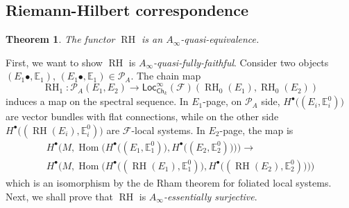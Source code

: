 \documentclass[12pt]{amsart}
\newtheorem{thm}{Theorem}[section]
\theoremstyle{definition}
\theoremstyle{remark}
\numberwithin{equation}{section}
\newcommand{\CF}{{\mathcal F}}
\newcommand{\A}{{A}}
\newcommand{\1}{{\mathbb{1}}}
\newcommand{\Ch}{\mathsf{Ch}}
\newcommand{\Loc}{\mathsf{Loc}}
\newcommand{\RH}{\operatorname{RH}}
\newcommand{\bt}{\bullet}
\newcommand{\Hom}{\operatorname{Hom}}
\begin{document}
\subsection{Riemann-Hilbert correspondence}
\begin{thm}
	The functor $\RH$ is an $A_{\infty}$-quasi-equivalence.
\end{thm}
First, we want to show $\RH$ is {\it $A_{\infty}$-quasi-fully-faithful}. Consider two objects $(E_1{\bt}, \mathbb{E}_1)$, $(E_1{\bt}, \mathbb{E}_1) \in  \mathcal{P}_{\A}$. The chain map
\begin{equation*}
    \RH_1:  \mathcal{P}_{\A}(E_1, E_2) \to \Loc^{\infty}_{\Ch_k}(\CF)(\RH_0(E_1), \RH_0(E_2))
\end{equation*}
induces a map on the spectral sequence.  In $E_1$-page, on $\mathcal{P}_{\A}$ side, $H^{\bt}\big((E_i, \mathbb{E}_i^0)\big)$ are vector bundles with flat connections, while on the other side $H^{\bt}\big((\RH(E_i), \mathbb{E}_i^0)\big)$ are $\CF$-local systems. In $E_2$-page, the map is 
\begin{align*}
    H^{\bt}\bigg(M, \Hom\Big( H^{\bt}\big((E_1, \mathbb{E}_1^0)\big), H^{\bt}\big((E_2, \mathbb{E}_2^0)\big)\Big)\bigg) \to\\
    H^{\bt}\bigg(M, \Hom\Big( H^{\bt}\big((\RH(E_1), \mathbb{E}_1^0)\big), H^{\bt}\big((\RH(E_2), \mathbb{E}_2^0)\big)\Big)\bigg)
\end{align*}
which is an isomorphism by the de Rham theorem for foliated local systems.
Next, we shall prove that  $\RH$ is {\it $A_{\infty}$-essentially surjective}. 
\end{document}

